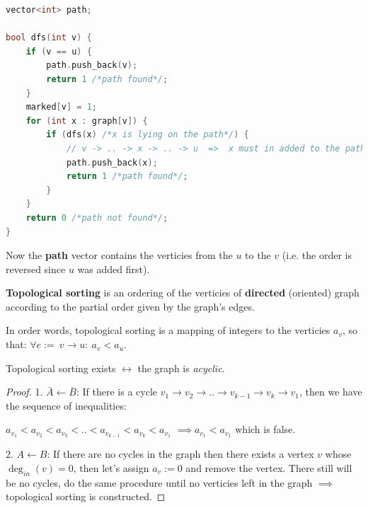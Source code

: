 \begin{lstlisting}[language=C++]
vector<int> path;

bool dfs(int v) {
    if (v == u) {
        path.push_back(v);
        return 1 /*path found*/;
    }
    marked[v] = 1;
    for (int x : graph[v]) {
        if (dfs(x) /*x is lying on the path*/) {
            // v -> .. -> x -> .. -> u  =>  x must in added to the path
            path.push_back(x);
            return 1 /*path found*/;
        }
    }
    return 0 /*path not found*/;
}
\end{lstlisting}

Now the \textbf{path} vector contains the verticies from the $u$ to the $v$ (i.e. the order is reversed since $u$ was added first).



\begin{definition}
    \textbf{Topological sorting} is an ordering of the verticies of \textbf{directed} (oriented) graph according to the partial order given by the graph's edges.

    In order words, topological sorting is a mapping of integers to the verticies $a_v$, so that: $\forall e := \ v \to u: \ a_v < a_u$.
\end{definition}

\begin{lemma}
    Topological sorting exists $\leftrightarrow$ the graph is \textit{acyclic}.
\end{lemma}

\begin{proof}

    1. \textbf{$\bar{A} \leftarrow \bar{B}$}: If there is a cycle $v_1 \to v_2 \to .. \to v_{k-1} \to v_k \to v_1$, then we have the sequence of inequalities:

    $a_{v_1} < a_{v_2} < a_{v_3} < .. < a_{v_{k-1}} < a_{v_k} < a_{v_1}$ $\implies a_{v_1} < a_{v_1}$ which is false.

    2. \textbf{$A \leftarrow B$}: If there are no cycles in the graph then there exists a vertex $v$ whose $\deg_{in}(v) = 0$, then let's assign $a_{v} := 0$ and remove the vertex. There still will be no cycles, do the same procedure until no verticies left in the graph $\implies$ topological sorting is constructed.

\end{proof}

